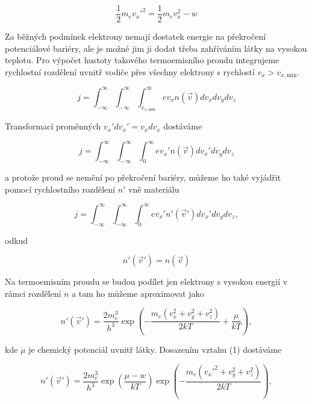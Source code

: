 \documentclass[a4paper,11pt]{article}
\begin{document}
\begin{equation}
 \frac{1}{2} m_e v_x'^2 = \frac{1}{2} m_e v_x^2 - w
\end{equation}

Za běžných podmínek elektrony nemají dostatek energie na překročení potenciálové bariéry, ale je možné jim ji dodat třeba zahříváním látky na vysokou teplotu. Pro výpočet hustoty takového termoemisního proudu integrujeme rychlostní rozdělení uvnitř vodiče přes všechny elektrony s rychlostí $v_x > v_{x,\text{min}}$.

\begin{equation}
 j = \int_{-\infty}^{\infty} \int_{-\infty}^{\infty} \int_{ v_{x,\text{min}} }^{\infty} e v_x n(\vec{v}) dv_x dv_y dv_z
\end{equation}

\noindent
Transformací proměnných $ v_x' dv_x' = v_x dv_x $ dostáváme

\begin{equation}
 j = \int_{-\infty}^{\infty} \int_{-\infty}^{\infty} \int_{ 0 }^{\infty} e v_x' n(\vec{v}) dv_x' dv_y dv_z
\end{equation}

\noindent
a protože proud se nemění po překročení bariéry, můžeme ho také vyjádřit pomocí rychlostního rozdělení $n'$ vně materiálu

\begin{equation}
 j = \int_{-\infty}^{\infty} \int_{-\infty}^{\infty} \int_{ 0 }^{\infty} e v_x' n'(\vec{v}') dv_x' dv_y dv_z,
\end{equation}

\noindent
odkud 

\begin{equation}
n'(\vec{v}') =  n(\vec{v})
\end{equation}

\noindent
Na termoemisním proudu se budou podílet jen elektrony s vysokou energií v rámci rozdělení $ n $ a tam ho můžeme aproximovat jako

\begin{equation}
 n'(\vec{v}') = \frac{2 m_e^3 }{h^{3}} \exp\left( - \frac{m_e(v_x^2 + v_y^2 + v_z^2)}{2kT} + \frac{\mu}{kT} \right),
\end{equation}

\noindent
kde $ \mu $ je chemický potenciál uvnitř látky. Dosazením vztahu (1) dostáváme

\begin{equation}
n'(\vec{v}') = \frac{2 m_e^3 }{h^{3}} \exp \left( \frac{\mu - w}{k T} \right) \exp\left( - \frac{m_e(v_x'^2 + v_y^2 + v_z^2)}{2kT} \right),
\end{equation}
\end{document}
